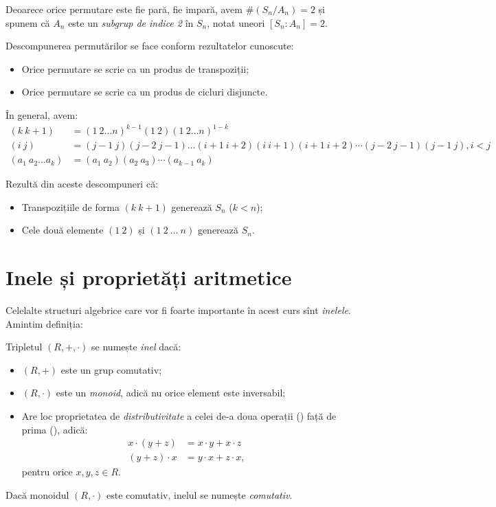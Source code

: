 Deoarece orice permutare este fie pară, fie impară, avem $\#(S_n/A_n) = 2$
și spunem că $ A_n $ este un \emph{subgrup de indice 2} în $ S_n $, notat
uneori $ [S_n : A_n] = 2 $.

Descompunerea permutărilor se face conform rezultatelor cunoscute:
\begin{itemize}
\item Orice permutare se scrie ca un produs de transpoziții;
\item Orice permutare se scrie ca un produs de cicluri disjuncte.
\end{itemize}

În general, avem:
\begin{align*}
  (k \ k+1) &= (1 \ 2 \dots n)^{k-1}(1 \ 2)(1 \ 2 \dots n)^{1-k} \\
  (i \ j) &= (j-1 \ j)(j-2 \ j-1) \dots (i+1 \ i+2) (i \ i+1) (i+1 \ i+2) \cdots %
            (j-2 \ j-1)(j-1 \ j), i < j \\
  (a_1 \ a_2 \dots a_k) &= (a_1 \ a_2)(a_2 \ a_3) \cdots (a_{k-1} \ a_k)
\end{align*}

Rezultă din aceste descompuneri că:
\begin{itemize}
\item Transpozițiile de forma $ (k \ k+1) $ generează $ S_n $ ($ k < n $);
\item Cele două elemente $ (1 \ 2) $ și $ (1 \ 2 \ \dots \ n ) $ generează $ S_n $.
\end{itemize}


\section{Inele și proprietăți aritmetice}

Celelalte structuri algebrice care vor fi foarte importante în acest curs
sînt \emph{inelele}. Amintim definiția:
\begin{definition}\label{def:inel} 
  Tripletul $(R, +, \cdot)$ se numește \emph{inel} dacă:
  \begin{itemize}
  \item $ (R, +) $ este un grup comutativ;
  \item $ (R, \cdot) $ este un \emph{monoid}, adică nu orice element este inversabil;
  \item Are loc proprietatea de \emph{distributivitate} a celei de-a doua operații
    () față de prima (), adică:
    \begin{align*}
      x \cdot (y + z) &= x \cdot y + x \cdot z \\
      (y + z) \cdot x &= y\cdot x + z \cdot x,
    \end{align*}
    pentru orice $ x, y, z \in R $.
  \end{itemize}
  Dacă monoidul $ (R, \cdot) $ este comutativ, inelul se numește \emph{comutativ}.
\end{definition}

